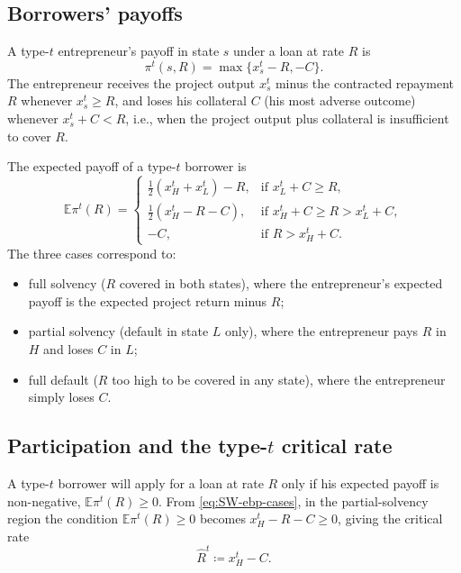 \documentclass[11pt,a4paper,oneside]{book}
\def\E{\mathbb{E}}
\def\geq{\geqslant}
\theoremstyle{plain}
\theoremstyle{definition}
\theoremstyle{remark}
\numberwithin{equation}{chapter}
\begin{document}
\subsection{Borrowers' payoffs}

A type-$t$ entrepreneur's payoff in state $s$ under a loan at rate $R$ is
\begin{equation}\label{eq:SW-entrepreneur}
  \pi^t(s, R) = \max\{ x^t_s - R, -C \}.
\end{equation}
The entrepreneur receives the project output $x^t_s$ minus the contracted repayment $R$ whenever $x^t_s \geq R$, and loses his collateral $C$ (his most adverse outcome) whenever $x^t_s + C < R$, i.e., when the project output plus collateral is insufficient to cover $R$.

The expected payoff of a type-$t$ borrower is
\begin{equation}\label{eq:SW-ebp-cases}
  \E \pi^t(R) = \begin{cases}
    \tfrac{1}{2}(x^t_H + x^t_L) - R, & \text{if } x^t_L + C \geq R, \\
    \tfrac{1}{2}(x^t_H - R - C), & \text{if } x^t_H + C \geq R > x^t_L + C, \\
    -C, & \text{if } R > x^t_H + C.
  \end{cases}
\end{equation}
The three cases correspond to:
\begin{itemize}
  \item full solvency ($R$ covered in both states), where the entrepreneur's expected payoff is the expected project return minus $R$;
  \item partial solvency (default in state $L$ only), where the entrepreneur pays $R$ in $H$ and loses $C$ in $L$;
  \item full default ($R$ too high to be covered in any state), where the entrepreneur simply loses $C$.
\end{itemize}

\subsection{Participation and the type-$t$ critical rate}

A type-$t$ borrower will apply for a loan at rate $R$ only if his expected payoff is non-negative, $\E \pi^t(R) \geq 0$.
From \eqref{eq:SW-ebp-cases}, in the partial-solvency region the condition $\E \pi^t(R) \geq 0$ becomes $x^t_H - R - C \geq 0$, giving the critical rate
\begin{equation}\label{eq:SW-critical-rate}
  \widehat{R}^t \coloneqq x^t_H - C.
\end{equation}
\end{document}
